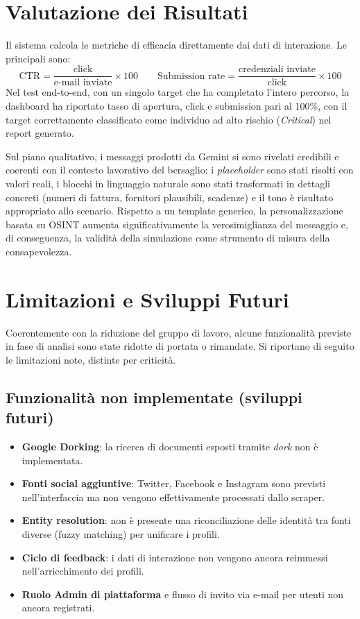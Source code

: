 \documentclass[12pt,a4paper,oneside]{report}
\begin{document}
\chapter{Valutazione dei Risultati}
Il sistema calcola le metriche di efficacia direttamente dai dati di interazione. Le
principali sono:
\[
\text{CTR} = \frac{\text{click}}{\text{e-mail inviate}}\times 100
\qquad
\text{Submission rate} = \frac{\text{credenziali inviate}}{\text{click}}\times 100
\]
Nel test end-to-end, con un singolo target che ha completato l'intero percorso, la dashboard
ha riportato tasso di apertura, click e submission pari al 100\%, con il target correttamente
classificato come individuo ad alto rischio (\emph{Critical}) nel report generato.

Sul piano qualitativo, i messaggi prodotti da Gemini si sono rivelati credibili e coerenti
con il contesto lavorativo del bersaglio: i \emph{placeholder} sono stati risolti con valori
reali, i blocchi in linguaggio naturale sono stati trasformati in dettagli concreti (numeri
di fattura, fornitori plausibili, scadenze) e il tono \`e risultato appropriato allo scenario.
Rispetto a un template generico, la personalizzazione basata su OSINT aumenta
significativamente la verosimiglianza del messaggio e, di conseguenza, la validit\`a della
simulazione come strumento di misura della consapevolezza.

\chapter{Limitazioni e Sviluppi Futuri}
Coerentemente con la riduzione del gruppo di lavoro, alcune funzionalit\`a previste in fase
di analisi sono state ridotte di portata o rimandate. Si riportano di seguito le limitazioni
note, distinte per criticit\`a.

\section{Funzionalit\`a non implementate (sviluppi futuri)}
\begin{itemize}[nosep]
  \item \textbf{Google Dorking}: la ricerca di documenti esposti tramite \emph{dork} non \`e
        implementata.
  \item \textbf{Fonti social aggiuntive}: Twitter, Facebook e Instagram sono previsti
        nell'interfaccia ma non vengono effettivamente processati dallo scraper.
  \item \textbf{Entity resolution}: non \`e presente una riconciliazione delle identit\`a
        tra fonti diverse (fuzzy matching) per unificare i profili.
  \item \textbf{Ciclo di feedback}: i dati di interazione non vengono ancora reimmessi
        nell'arricchimento dei profili.
  \item \textbf{Ruolo Admin di piattaforma} e flusso di invito via e-mail per utenti non
        ancora registrati.
\end{itemize}
\end{document}
